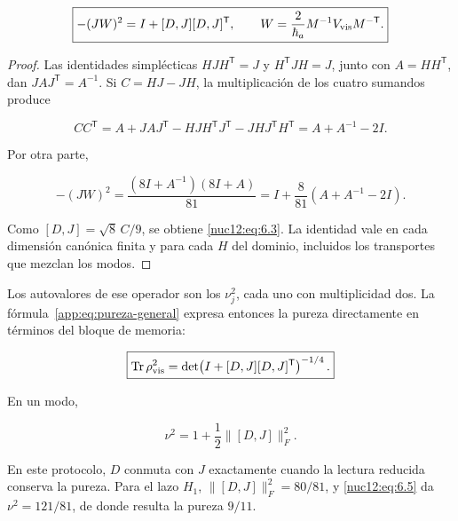 \begin{equation}
\boxed{-(JW)^2=I+[D,J][D,J]^{\mathsf T},\qquad
W=\frac{2}{\hbar_a}M^{-1}V_{\rm vis}M^{-\mathsf T}.}
\label{nuc12:eq:6.3}
\end{equation}



\begin{proof}
Las identidades simplécticas \(HJH^{\mathsf T}=J\) y \(H^{\mathsf T}JH=J\), junto con \(A=HH^{\mathsf T}\), dan \(JAJ^{\mathsf T}=A^{-1}\). Si \(C=HJ-JH\), la multiplicación de los cuatro sumandos produce



\[
CC^{\mathsf T}
=A+JAJ^{\mathsf T}
-HJH^{\mathsf T}J^{\mathsf T}
-JHJ^{\mathsf T}H^{\mathsf T}
=A+A^{-1}-2I.
\]



Por otra parte,



\[
-(JW)^2
=\frac{(8I+A^{-1})(8I+A)}{81}
=I+\frac8{81}(A+A^{-1}-2I).
\]



Como \([D,J]=\sqrt8\,C/9\), se obtiene \eqref{nuc12:eq:6.3}. La identidad vale en cada dimensión canónica finita y para cada \(H\) del dominio, incluidos los transportes que mezclan los modos.
\end{proof}

Los autovalores de ese operador son los \(\nu_j^2\), cada uno con multiplicidad dos. La fórmula~\eqref{app:eq:pureza-general} expresa entonces la pureza directamente en términos del bloque de memoria:



\begin{equation}
\boxed{\operatorname{Tr}\rho_{\rm vis}^2
=\det\!\left(I+[D,J][D,J]^{\mathsf T}\right)^{-1/4}.}
\label{nuc12:eq:6.4}
\end{equation}



En un modo,



\begin{equation}
\nu^2=1+\frac12\|[D,J]\|_F^2.
\label{nuc12:eq:6.5}
\end{equation}



En este protocolo, \(D\) conmuta con \(J\) exactamente cuando la lectura reducida conserva la pureza. Para el lazo \(H_1\), \(\|[D,J]\|_F^2=80/81\), y \eqref{nuc12:eq:6.5} da \(\nu^2=121/81\), de donde resulta la pureza \(9/11\).

